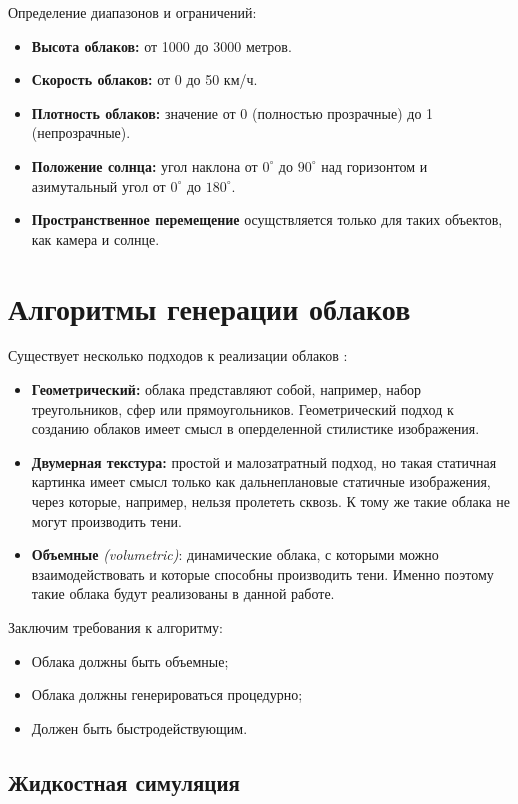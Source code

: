 Определение диапазонов и ограничений:
\begin{itemize}
	\item \textbf{Высота облаков:} от 1000 до 3000 метров.
	\item \textbf{Скорость облаков:} от 0 до 50 км/ч.
	\item \textbf{Плотность облаков:} значение от 0 (полностью прозрачные) до 1 (непрозрачные).
	\item \textbf{Положение солнца:} угол наклона от $0^{\circ}$ до $90^{\circ}$ над горизонтом и азимутальный угол от $0^{\circ}$ до $180^{\circ}$.
	\item \textbf{Пространственное перемещение} осущствляется только для таких объектов, как камера и солнце.
\end{itemize}

\section{Алгоритмы генерации облаков}
Существует несколько подходов к реализации облаков \cite{unigine_volumetric_clouds_2022}:	\begin{itemize}
\item \textbf{Геометрический:} облака представляют собой, например, набор треугольников, сфер или прямоугольников. Геометрический подход к созданию облаков имеет смысл в оперделенной стилистике изображения.
\item \textbf{Двумерная текстура:} простой и малозатратный подход, но такая статичная картинка имеет смысл только как дальнеплановые статичные изображения, через которые, например, нельзя пролететь сквозь. К тому же такие облака не могут производить тени.
\item \textbf{Объемные} \textit{(volumetric)}: динамические облака, с которыми можно взаимодействовать и которые способны производить тени. Именно поэтому такие облака будут реализованы в данной работе.
\end{itemize}

Заключим требования к алгоритму:
\begin{itemize}
	\item Облака должны быть объемные;
	\item Облака должны генерироваться процедурно;
	\item Должен быть быстродействующим.
\end{itemize}
\subsection{Жидкостная симуляция} 

